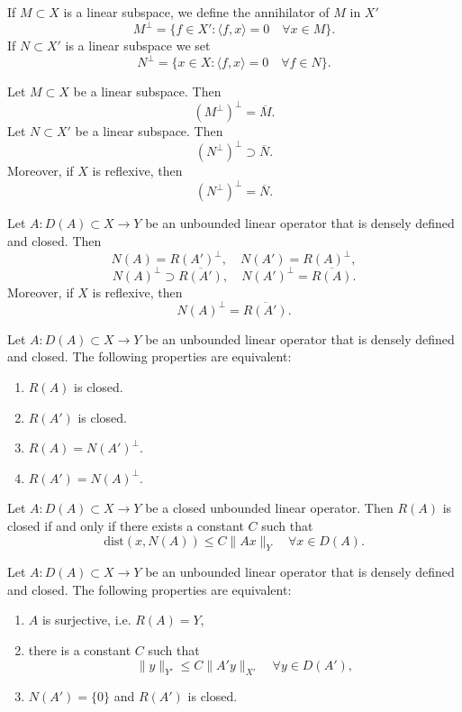 \begin{definition}
If $M\subset X$ is a linear subspace,  we define the annihilator of $M$ in $X'$
\[
M^{\perp}=\{f\in X': \langle f, x\rangle=0\quad \forall x\in M\}.
\]
If $N\subset X'$ is a linear subspace we set
\[
N^{\perp}=\{x\in X: \langle f, x\rangle=0\quad \forall f\in N\}.
\]
\end{definition}

\begin{lemma}
Let $M\subset X$ be a linear subspace. Then
\[
(M^{\perp})^{\perp}=\overline{M}.
\]
Let $N\subset X'$ be a linear subspace. Then
\[
(N^{\perp})^{\perp}\supset\overline{N}.
\]
Moreover, if $X$ is reflexive, then
\[
(N^{\perp})^{\perp}=\overline{N}.
\]
\end{lemma}

\begin{theorem}
Let $A: D(A)\subset X\to Y$ be an unbounded linear operator that is densely defined and closed. Then
\[
N(A)=R(A')^{\perp},
\quad
N(A')=R(A)^{\perp},
\]
\[
N(A)^{\perp}\supset \overline{R(A')},
\quad
N(A')^{\perp}= \overline{R(A)}.
\]
Moreover, if $X$ is reflexive, then
\[
N(A)^{\perp}= \overline{R(A')}.
\]
\end{theorem}

\begin{theorem}
Let $A: D(A)\subset X\to Y$ be an unbounded linear operator that is densely defined and closed. The following properties are equivalent:
\begin{enumerate}[label=(\roman*)]
\item $R(A)$ is closed.
\item $R(A')$ is closed.
\item $R(A)=N(A')^{\perp}$.
\item $R(A')=N(A)^{\perp}$.
\end{enumerate}
\end{theorem}

\begin{theorem}
Let $A: D(A)\subset X\to Y$ be a closed unbounded linear operator. Then $R(A)$ is closed if and only if there exists a constant $C$ such that
\[
\textrm{dist}(x, N(A))\leq C\|Ax\|_Y\quad \forall x\in D(A).
\]
\end{theorem}

\begin{theorem}
Let $A: D(A)\subset X\to Y$ be an unbounded linear operator that is densely defined and closed. The following properties are equivalent:
\begin{enumerate}[label=(\alph*)]
\item $A$ is surjective, i.e. $R(A)=Y$,
\item there is a constant $C$ such that
\[
\|y\|_{Y'}\leq C\|A'y\|_{X'}\quad \forall y\in D(A'),
\]
\item $N(A')=\{0\}$ and $R(A')$ is closed.
\end{enumerate}
\end{theorem}

